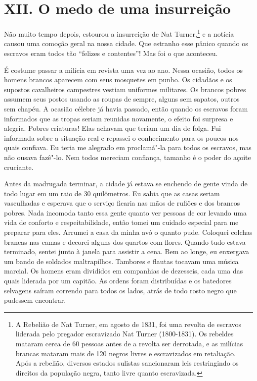 \chapter{XII. O medo de uma
insurreição}

Não muito tempo depois, estourou a
insurreição de Nat Turner,\footnote{A Rebelião de Nat Turner, em agosto
  de 1831, foi uma revolta de escravos liderada pelo pregador
  escravizado Nat Turner (1800-1831). Os rebeldes mataram cerca de 60
  pessoas antes de a revolta ser derrotada, e as milícias brancas
  mataram mais de 120 negros livres e escravizados em retaliação. Após a
  rebelião, diversos estados sulistas sancionaram leis restringindo os
  direitos da população negra, tanto livre quanto escravizada.} e a
notícia causou uma comoção geral na nossa cidade. Que estranho esse
pânico quando os escravos eram todos tão ``felizes e contentes''! Mas
foi o que aconteceu.

É costume passar a milícia em revista
uma vez ao ano. Nessa ocasião, todos os homens brancos aparecem com seus
mosquetes em punho. Os cidadãos e os supostos cavalheiros campestres
vestiam uniformes militares. Os brancos pobres assumem seus postos
usando as roupas de sempre, alguns sem sapatos, outros sem chapéu. A
ocasião célebre já havia passado, então quando os escravos foram
informados que as tropas seriam reunidas novamente, o efeito foi
surpresa e alegria. Pobres criaturas! Elas achavam que teriam um dia de
folga. Fui informada sobre a situação real e repassei o conhecimento
para os poucos nos quais confiava. Eu teria me alegrado em proclamá"-la
para todos os escravos, mas não ousava fazê"-lo. Nem todos mereciam
confiança, tamanho é o poder do açoite cruciante.

Antes da madrugada terminar, a cidade
já estava se enchendo de gente vinda de todo lugar em um raio de 30
quilômetros. Eu sabia que as casas seriam vasculhadas e esperava que o
serviço ficaria nas mãos de rufiões e dos brancos pobres. Nada incomoda
tanto essa gente quanto ver pessoas de cor levando uma vida de conforto
e respeitabilidade, então tomei um cuidado especial para me preparar
para eles. Arrumei a casa da minha avó o quanto pude. Coloquei colchas
brancas nas camas e decorei alguns dos quartos com flores. Quando tudo
estava terminado, sentei junto à janela para assistir a cena. Bem ao
longe, eu enxergava um bando de soldados maltrapilhos. Tambores e
flautas tocavam uma música marcial. Os homens eram divididos em
companhias de dezesseis, cada uma das quais liderada por um capitão. As
ordens foram distribuídas e os batedores selvagens saíram correndo para
todos os lados, atrás de todo rosto negro que pudessem encontrar.

